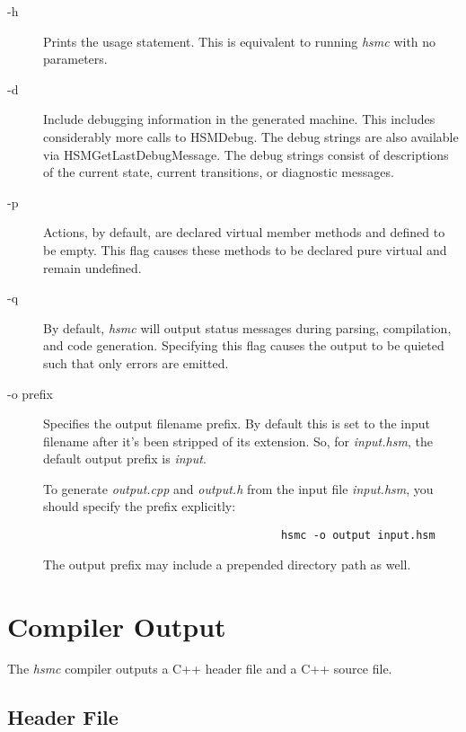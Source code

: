 \documentclass[titlepage,letterpaper]{report}
\begin{document}
\begin{description}

  \item[-h] Prints the usage statement.  This is equivalent to running \emph{hsmc} with no parameters.
	
	\item[-d] Include debugging information in the generated machine.  This includes considerably more
	          calls to HSMDebug.  The debug strings are also available via HSMGetLastDebugMessage.
						The debug strings consist of descriptions of the current state, current transitions, or
						diagnostic messages.
						
	\item[-p] Actions, by default, are declared virtual member methods and defined to be empty.  This flag 
	          causes these methods to be declared pure virtual and remain undefined. \label{opt:p}
						
	\item[-q] By default, \emph{hsmc} will output status messages during parsing, compilation, and code
	          generation.  Specifying this flag causes the output to be quieted such that only errors
						are emitted.
						
	\item[-o prefix] Specifies the output filename prefix.  By default this is set to the input filename
	                 after it's been stripped of its extension.  So, for \emph{input.hsm}, the default 
									 output prefix is \emph{input}.

	                 To generate \emph{output.cpp} and \emph{output.h} from the input file \emph{input.hsm}, 
									 you should specify the prefix explicitly:
	                 \begin{verbatim}
									 hsmc -o output input.hsm
									 \end{verbatim}
									 The output prefix may include a prepended directory path as well.
									 
\end{description}





\section{Compiler Output}

The \emph{hsmc} compiler outputs a C++ header file and a C++ source file.

\subsection{Header File}
\end{document}
